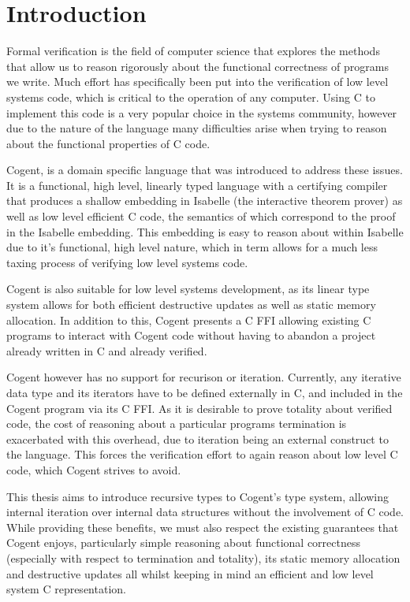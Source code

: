 \chapter{Introduction}\label{ch:intro}


Formal verification is the field of computer science that explores the methods that allow us to
  reason rigorously about the functional correctness of programs we write. 
Much effort has specifically been put into the verification of low level systems code,
  which is critical to the operation of any computer.
Using C to implement this code is a very popular choice in the systems community,
  however due to the nature of the language many difficulties arise when trying to
  reason about the functional properties of C code.

Cogent\cite{OCo16}, is a domain specific language that was introduced to address these issues.
It is a functional, high level, linearly typed language with a certifying compiler
  that produces a shallow embedding in Isabelle (the interactive theorem prover) as well as low level efficient C code,
  the semantics of which correspond to the proof in the Isabelle embedding.
This embedding is easy to reason about within Isabelle due to it's functional,
  high level nature, which in term allows for a much less taxing process of verifying low level systems code. 

Cogent is also suitable for low level systems development,
  as its linear type system allows for both efficient destructive updates as well as static memory allocation.
In addition to this, Cogent presents a C FFI allowing existing C programs to interact with Cogent code without having to
  abandon a project already written in C and already verified.

Cogent however has no support for recurison or iteration. 
Currently, any iterative data type and its iterators have to be defined externally in C,
  and included in the Cogent program via its C FFI.
As it is desirable to prove totality about verified code,
  the cost of reasoning about a particular programs termination is exacerbated with this overhead,
  due to iteration being an external construct to the language.
This forces the verification effort to again reason about low level C code, which Cogent strives to avoid.

This thesis aims to introduce recursive types to Cogent's type system, allowing internal iteration over
  internal data structures without the involvement of C code.
While providing these benefits, we must also respect the existing guarantees that Cogent enjoys,
  particularly simple reasoning about functional correctness (especially with respect to termination and totality),
  its static memory allocation and destructive updates all whilst keeping in mind
  an efficient and low level system C representation.